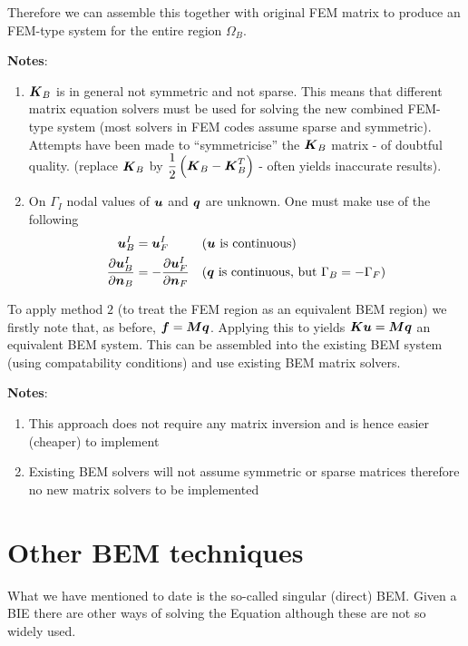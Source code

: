 Therefore we can assemble this together with original FEM matrix to produce an
FEM-type system for the entire region $\Omega_{B}$.

\textbf{Notes}:
\begin{enumerate}
\item $\matr{K}_{B}$ is in general not symmetric and not sparse.  This means
  that different matrix equation solvers must be used for solving the new
  combined FEM-type system (most solvers in FEM codes assume sparse and
  symmetric). Attempts have been made to ``symmetricise'' the $\matr{K}_{B}$
  matrix - of doubtful quality. (\eg replace $\matr{K}_{B}$ by 
  $\dfrac{1}{2}\pbrac{ \matr{K}_{B}-\matr{K}_{B}^{T}}$ - 
  often yields inaccurate results).
\item On $\Gamma_{I}$ nodal values of $\vect{u}$ and $\vect{q}$ are unknown.  One
  must make use of the following
  \begin{alignat*}{2}
    \vect{u}_{B}^{I} &= \vect{u}_{F}^{I} && \text{($\vect{u}$ is continuous)}
    \\ \delby{\vect{u}_{B}^{I}}{\vect{n}_{B}} &= -\delby{\vect{u}_{F}^{I}}
    {\vect{n}_{F}} && \text{($\vect{q}$ is continuous, but $\Gamma_{B} =
      -\Gamma_{F}$)}
  \end{alignat*}
\end{enumerate}

To apply method $2$ (\ie to treat the FEM region as an equivalent BEM region)
we firstly note that, as before, $\vect{f}=\matr{M}\vect{q}$. Applying this to
 yields $\matr{K}\vect{u}=\matr{M}\vect{q}$ an
equivalent BEM system.  This can be assembled into the existing BEM system
(using compatability conditions) and use existing BEM matrix solvers.

\textbf{Notes}:
\begin{enumerate}
\item This approach does not require any matrix inversion and is hence easier
  (cheaper) to implement
\item Existing BEM solvers will not assume symmetric or sparse matrices
  therefore no new matrix solvers to be implemented
\end{enumerate}

\section{Other BEM techniques}

What we have mentioned to date is the so-called singular (direct) BEM.  Given
a BIE there are other ways of solving the Equation although these are not so
widely used.

